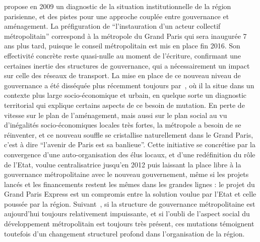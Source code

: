 \cite{gilli2009paris} propose en 2009 un diagnostic de la situation institutionnelle de la région parisienne, et des pistes pour une approche couplée entre gouvernance et aménagement. La préfiguration de ``l'instauration d'un acteur collectif métropolitain'' correspond à la métropole du Grand Paris qui sera inaugurée 7 ans plus tard, puisque le conseil métropolitain est mis en place fin 2016. Son effectivité concrète reste quasi-nulle au moment de l'écriture, confirmant une certaines inertie des structures de gouvernance, qui a nécessairement un impact sur celle des réseaux de transport. La mise en place de ce nouveau niveau de gouvernance a été disséquée plus récemment toujours par~\cite{gilli2014gouverner}, où il la situe dans un contexte plus large socio-économique et urbain, en quelque sorte un diagnostic territorial qui explique certains aspects de ce besoin de mutation. En perte de vitesse sur le plan de l'aménagement, mais aussi sur le plan social au vu d'inégalités socio-économiques locales très fortes, la métropole a besoin de se réinventer, et ce nouveau souffle se cristallise naturellement dans le Grand Paris, c'est à dire ``l'avenir de Paris est sa banlieue''. Cette initiative se concrétise par la convergence d'une auto-organisation des élus locaux, et d'une redéfinition du rôle de l'Etat, voulue centralisatrice jusqu'en 2012 puis laissant la place libre à la gouvernance métropolitaine avec le nouveau gouvernement, même si les projets lancés et les financements restent les mêmes dans les grandes lignes : le projet du Grand Paris Express est un compromis entre la solution voulue par l'Etat et celle poussée par la région. Suivant~\cite{desjardins2016grand}, si la structure de gouvernance métropolitaine est aujourd'hui toujours relativement impuissante, et si l'oubli de l'aspect social du développement métropolitain est toujours très présent, ces mutations témoignent toutefois d'un changement structurel profond dans l'organisation de la région.




